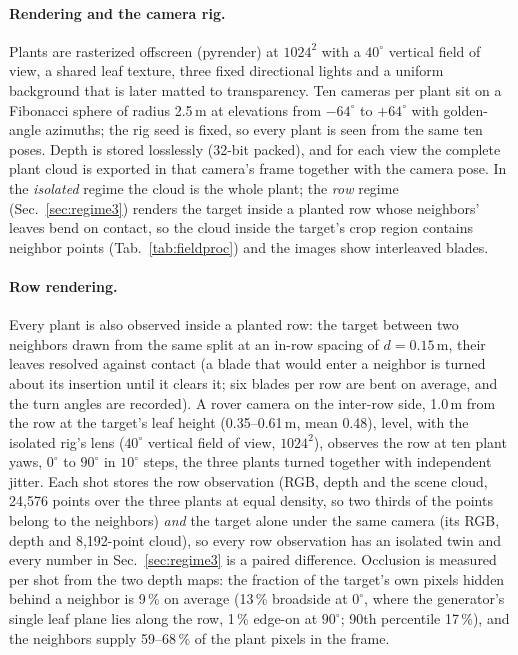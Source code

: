 \paragraph{Rendering and the camera rig.}
Plants are rasterized offscreen (pyrender) at $1024^2$ with a $40^\circ$
vertical field of view, a shared leaf texture, three fixed directional lights
and a uniform background that is later matted to transparency. Ten cameras per
plant sit on a Fibonacci sphere of radius 2.5\,m at elevations from
$-64^\circ$ to $+64^\circ$ with golden-angle azimuths; the rig seed is fixed,
so every plant is seen from the same ten poses. Depth is stored losslessly
(32-bit packed), and for each view the complete plant cloud is exported in that
camera's frame together with the camera pose. In the \emph{isolated} regime the
cloud is the whole plant; the \emph{row} regime (Sec.~\ref{sec:regime3}) renders
the target inside a planted row whose neighbors' leaves bend on contact, so the
cloud inside the target's crop region contains neighbor points
(Tab.~\ref{tab:fieldproc}) and the images show interleaved blades.
\paragraph{Row rendering.}
Every plant is also observed inside a planted row: the target between two
neighbors drawn from the same split at an in-row spacing of $d=0.15$\,m, their
leaves resolved against contact (a blade that would enter a neighbor is turned
about its insertion until it clears it; six blades per row are bent on average,
and the turn angles are recorded). A rover camera on the inter-row side,
1.0\,m from the row at the target's leaf height (0.35--0.61\,m, mean 0.48),
level, with the isolated rig's lens ($40^\circ$ vertical field of view,
$1024^2$), observes the row at ten plant yaws, $0^\circ$ to $90^\circ$ in
$10^\circ$ steps, the three plants turned together with independent jitter.
Each shot stores the row observation (RGB, depth and the scene cloud, 24{,}576
points over the three plants at equal density, so two thirds of the points
belong to the neighbors) \emph{and} the target alone under the same camera
(its RGB, depth and 8{,}192-point cloud), so every row observation has an
isolated twin and every number in Sec.~\ref{sec:regime3} is a paired
difference. Occlusion is measured per shot from the two depth maps: the
fraction of the target's own pixels hidden behind a neighbor is 9\,\% on
average (13\,\% broadside at $0^\circ$, where the generator's single leaf
plane lies along the row, 1\,\% edge-on at $90^\circ$; 90th percentile
17\,\%), and the neighbors supply 59--68\,\% of the plant pixels in the frame.

